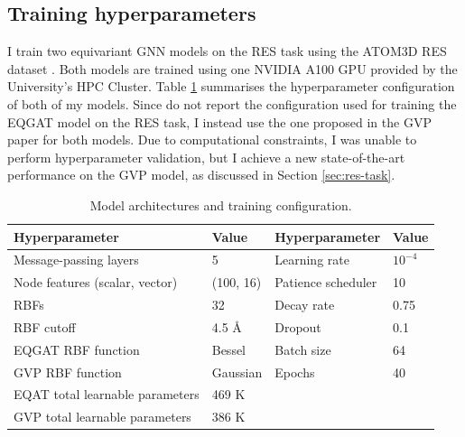 \subsection{Training hyperparameters}
\label{training-details}
I train two equivariant GNN models on the RES task using the ATOM3D RES dataset \cite{atom-3d}. Both models are trained using one NVIDIA A100 GPU provided by the University's HPC Cluster.  Table \ref{hyperparameters} summarises the hyperparameter configuration of both of my models. Since \citet{eqgat2} do not report the configuration used for training the EQGAT model on the RES task, I instead use the one proposed in the GVP paper for both models. Due to computational constraints, I was unable to perform hyperparameter validation, but I achieve a new state-of-the-art performance on the GVP model, as discussed in Section \ref{sec:res-task}.

\begin{table}[!h]
\centering
\caption{Model architectures and training configuration.}
\vskip 0.15in
\label{hyperparameters}
\begin{tabular}{@{}llll@{}}
\toprule
Hyperparameter                  & \multicolumn{1}{l|}{Value}     & Hyperparameter     & Value     \\ \midrule
Message-passing layers          & \multicolumn{1}{l|}{5}         & Learning rate      & $10^{-4}$ \\
Node features (scalar, vector)  & \multicolumn{1}{l|}{(100, 16)} & Patience scheduler & 10        \\
RBFs                            & \multicolumn{1}{l|}{32}        & Decay rate         & 0.75      \\
RBF cutoff                      & \multicolumn{1}{l|}{4.5 \AA}   & Dropout            & 0.1       \\
EQGAT RBF function              & \multicolumn{1}{l|}{Bessel}    & Batch size         & 64        \\
GVP RBF function                & \multicolumn{1}{l|}{Gaussian}  & Epochs             & 40        \\ \midrule
EQAT total learnable parameters & 469 K                          &                    &           \\
GVP total learnable parameters  & 386 K                          &                    &           \\ \bottomrule
\end{tabular}
\end{table}

